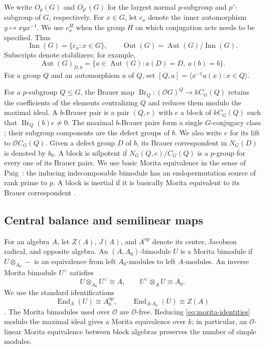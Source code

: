 \documentclass[11pt,a4paper]{article}
\theoremstyle{definition}
\theoremstyle{remark}
\numberwithin{equation}{section}
\newcommand{\cO}{\mathcal{O}}
\DeclareMathOperator{\Aut}{Aut}
\DeclareMathOperator{\Inn}{Inn}
\DeclareMathOperator{\Out}{Out}
\DeclareMathOperator{\End}{End}
\DeclareMathOperator{\Br}{Br}
\newcommand{\op}{\mathrm{op}}
\begin{document}
	We write $O_p(G)$ and $O_{p'}(G)$ for the largest normal $p$-subgroup and
	$p'$-subgroup of $G$, respectively. For $x\in G$, let $c_x$ denote the inner
	automorphism $y\mapsto xyx^{-1}$. We use $c_x^H$ when the group $H$
	on which conjugation acts needs to be specified. Thus
	\[
	\Inn(G)=\{c_x:x\in G\},\qquad \Out(G)=\Aut(G)/\Inn(G).
	\]
	Subscripts denote stabilizers; for example,
	\[
	\Aut(G)_{D,b}=\{a\in\Aut(G):a(D)=D,\ a(b)=b\}.
	\]
	For a group $Q$ and an automorphism $a$ of $Q$, set
	$[Q,a]=\langle x^{-1}a(x):x\in Q\rangle$.
	
	For a $p$-subgroup $Q\leq G$, the Brauer map
	$\Br_Q:(\cO G)^Q\longrightarrow kC_G(Q)$ retains the coefficients of the
	elements centralizing $Q$ and reduces them modulo the maximal ideal. A
	$b$-Brauer pair is a pair $(Q,e)$ with $e$ a block of $kC_G(Q)$ such that
	$\Br_Q(b)e\ne0$. The maximal $b$-Brauer pairs form a single $G$-conjugacy
	class \cite[Theorem~3.10]{AlperinBroue1979}; their subgroup components are the defect groups
	of $b$. We also write $e$ for its lift to $\cO C_G(Q)$. Given a defect group
	$D$ of $b$, its Brauer correspondent in $N_G(D)$ is denoted by $b_0$.
	A block is nilpotent if $N_G(Q,e)/C_G(Q)$ is a $p$-group for every one of its
	Brauer pairs. We use basic Morita equivalence in the sense of
	Puig~\cite[Corollary~7.4]{Puig1999}: the inducing indecomposable bimodule has
	an endopermutation source of rank prime to $p$. A block is inertial if it is basically
	Morita equivalent to its Brauer correspondent \cite[Definition~2.16]{Puig2011}.
	
	\subsection{Central balance and semilinear maps}
	
	For an algebra $A$, let $Z(A)$, $J(A)$, and $A^{\op}$ denote its center,
	Jacobson radical, and opposite algebra. An $(A,A_0)$-bimodule $U$ is a Morita
	bimodule if $U\otimes_{A_0}-$ is an equivalence from left $A_0$-modules to left
	$A$-modules. An inverse Morita bimodule $U^\vee$ satisfies
	\begin{equation}\label{eq:morita-identities}
		U\otimes_{A_0} U^\vee\cong A,\qquad
		U^\vee\otimes_A U\cong A_0.
	\end{equation}
	We use the standard identifications
	\[
	\End_A(U)\cong A_0^{\op},\qquad \End_{A\text{-}A_0}(U)\cong Z(A)
	\]
	\cite[Theorem~2.8.2 and the proof of Corollary~2.8.6]{Linckelmann2018a}.
	The Morita bimodules used over $\cO$ are $\cO$-free. Reducing
	\eqref{eq:morita-identities} modulo the maximal ideal gives a Morita equivalence
	over $k$; in particular, an $\cO$-linear Morita equivalence between block
	algebras preserves the number of simple modules.
	
\end{document}
